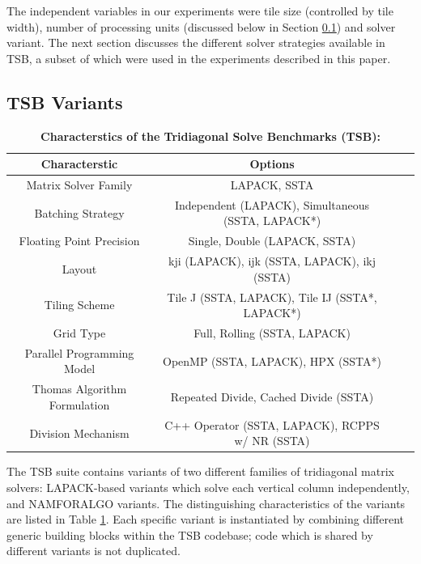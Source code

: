 \documentclass[conference]{IEEEtran}
\begin{document}
The independent variables in our experiments were tile size (controlled by tile
width), number of processing units (discussed below in Section \ref{}) and
solver variant. The next section discusses the different solver strategies
available in TSB, a subset of which were used in the experiments described in
this paper.

\subsection{TSB Variants}

\begin{table}%
\centering
\caption{\textbf{Characterstics of the Tridiagonal Solve Benchmarks (TSB):}}
\begin{tabular}{|c|c|c|c|} \hline
\textbf{Characterstic}       & \textbf{Options}                                     \\ \hline
Matrix Solver Family         & LAPACK, SSTA                                         \\ \hline
Batching Strategy            & Independent (LAPACK), Simultaneous (SSTA, LAPACK*)   \\ \hline
Floating Point Precision     & Single, Double (LAPACK, SSTA)                        \\ \hline 
Layout                       & kji (LAPACK), ijk (SSTA, LAPACK), ikj (SSTA)         \\ \hline
Tiling Scheme                & Tile J (SSTA, LAPACK), Tile IJ (SSTA*, LAPACK*)      \\ \hline
Grid Type                    & Full, Rolling (SSTA, LAPACK)                         \\ \hline
Parallel Programming Model   & OpenMP (SSTA, LAPACK), HPX (SSTA*)                   \\ \hline
Thomas Algorithm Formulation & Repeated Divide, Cached Divide (SSTA)                \\ \hline
Division Mechanism           & C++ Operator (SSTA, LAPACK), RCPPS w/ NR (SSTA)      \\ \hline
\end{tabular}
\label{tab:tsb_variant_characterstics}
\end{table}

The TSB suite contains variants of two different families of tridiagonal matrix
solvers: LAPACK-based variants which solve each vertical column independently, and
NAMFORALGO variants. The distinguishing characteristics of the variants are
listed in Table \ref{tab:tsb_variant_characterstics}. Each specific variant is
instantiated by combining different generic building blocks within the TSB
codebase; code which is shared by different variants is not duplicated.
\end{document}
